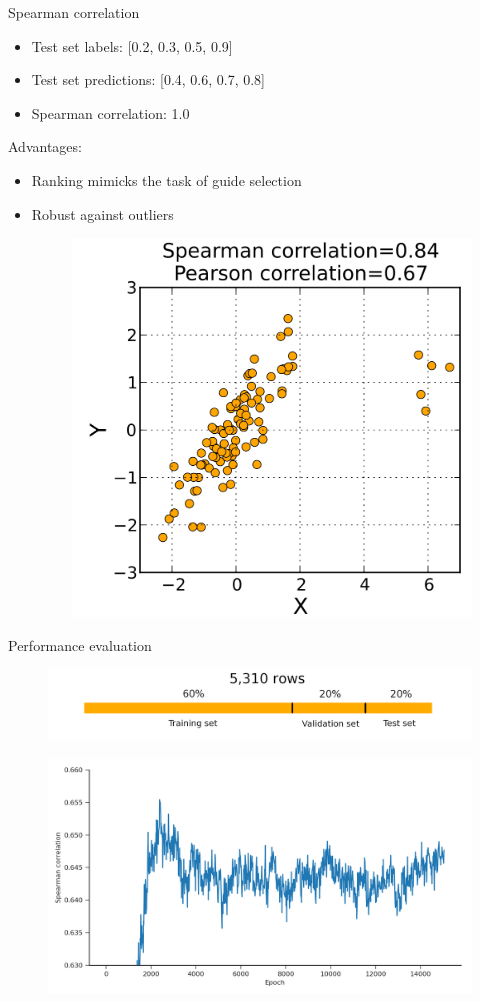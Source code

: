 \documentclass[Nike]{tuberlinbeamer}
\begin{document}
\begin{frame}{Spearman correlation}
  \begin{itemize}
    \item Test set labels: [0.2, 0.3, 0.5, 0.9]
    \item Test set predictions: [0.4, 0.6, 0.7, 0.8]
    \item Spearman correlation: 1.0
  \end{itemize}
  \pause
  \vspace{0.3cm}
  {\large Advantages:}
  \begin{itemize}
    \item Ranking mimicks the task of guide selection
    \pause
    \item Robust against outliers
    \begin{figure}
      \includegraphics[width=0.30\linewidth]{./Spearman2.png}
    \end{figure}
  \end{itemize}
\end{frame}



\begin{frame}{Performance evaluation}
  \begin{figure}
    \includegraphics[width=0.60\linewidth]{./datasetpartition.png}
  \end{figure}
  \pause
  \begin{figure}
    \includegraphics[width=0.75\linewidth]{./validation_training_curve.png}
  \end{figure}

\end{frame}
\end{document}

